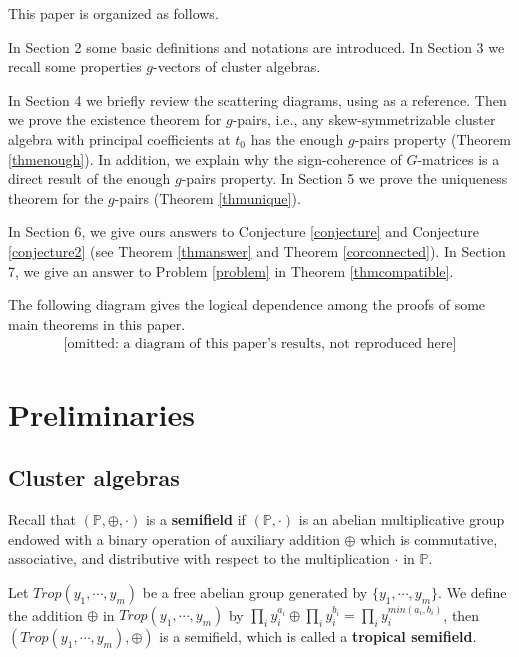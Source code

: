 \documentclass[14pt]{amsart}
\begin{document}
This paper is organized as follows.

In Section 2 some basic definitions and notations are introduced.
In Section 3 we recall some properties $g$-vectors of  cluster algebras.


In Section 4  we briefly review the scattering diagrams, using \cite{M} as a reference. Then we prove the existence theorem for $g$-pairs, i.e., any skew-symmetrizable cluster algebra with principal coefficients at $t_0$ has  the enough $g$-pairs property  (Theorem \ref{thmenough}). In addition, we explain why the sign-coherence of $G$-matrices is a direct result of  the enough $g$-pairs property. In Section 5 we prove the uniqueness theorem for the $g$-pairs (Theorem \ref{thmunique}).



In Section 6, we give ours answers to  Conjecture \ref{conjecture} and Conjecture \ref{conjecture2} (see Theorem \ref{thmanswer} and Theorem \ref{corconnected}).
In Section 7, we give an answer to Problem \ref{problem} in Theorem \ref{thmcompatible}.

 The following diagram gives  the logical dependence among the proofs of some main theorems in this paper.
$$
\begin{array}{ccc}
\mbox{[omitted: a diagram of this paper's results, not reproduced here]}
\end{array}
$$
\vspace{5mm}

\section{Preliminaries}

\subsection{Cluster algebras}
Recall that $(\mathbb P, \oplus, \cdot)$ is a {\bf semifield } if $(\mathbb P,  \cdot)$ is an abelian multiplicative group endowed with a binary operation of auxiliary addition $\oplus$ which is commutative, associative, and distributive with respect to the multiplication $\cdot$ in $\mathbb P$.

Let $Trop(y_1,\cdots,y_m)$ be a free abelian group generated by $\{y_1,\cdots,y_m\}$. We define the addition $\oplus$ in $Trop(y_1,\cdots,y_m)$ by $\prod\limits_{i}y_i^{a_i}\oplus\prod\limits_{i}y_i^{b_i}=\prod\limits_{i}y_i^{min(a_i,b_i)}$, then $(Trop(y_1,\cdots,y_m), \oplus)$ is a semifield, which is called a {\bf tropical semifield}.
\end{document}
